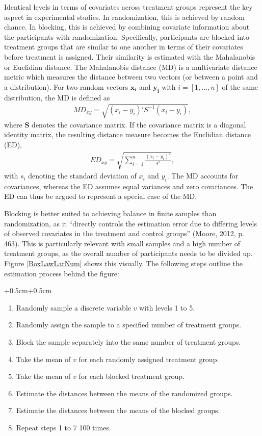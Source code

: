 \documentclass[12pt,econ]{sources/authesis}
\begin{document}
Identical levels in terms of covariates across treatment groups represent the key aspect in experimental studies. In randomization, this is achieved by random chance. In blocking, this is achieved by combining covariate information about the participants with randomization. Specifically, participants are blocked into treatment groups that are similar to one another in terms of their covariates before treatment is assigned. Their similarity is estimated with the Mahalanobis or Euclidian distance. The Mahalanobis distance (MD) is a multivariate distance metric which measures the distance between two vectors (or between a point and a distribution). For two random vectors \(\bm{x_i}\) and \(\bm{y_i}\) with \(i = [1,\ldots,n]\) of the same distribution, the MD is defined as
\begin{align}
MD_{xy} = \sqrt{(x_i - y_i)' S^{-1} (x_i - y_i)},
\end{align}
where \(\bm{S}\) denotes the covariance matrix. If the covariance matrix is a diagonal identity matrix, the resulting distance measure becomes the Euclidian distance (ED),
\begin{align}
ED_{xy} = \sqrt{\sum_{i=1}^n \frac{(x_i - y_i)^2}{s^2}},
\end{align}
with \(s_i\) denoting the standard deviation of \(x_i\) and \(y_i\). The MD accounts for covariances, whereas the ED assumes equal variances and zero covariances. The ED can thus be argued to represent a special case of the MD.

Blocking is better suited to achieving balance in finite samples than randomization, as it ``directly controls the estimation error due to differing levels of observed covariates in the treatment and control groups'' (Moore, 2012, p. 463). This is particularly relevant with small samples and a high number of treatment groups, as the overall number of participants needs to be divided up. Figure \ref{BoxLawLarNum} shows this visually. The following steps outline the estimation process behind the figure:

\vspace{0.3cm}
\begin{adjustwidth*}{+0.5cm}{+0.5cm}
\begin{enumerate}
\item \noindent Randomly sample a discrete variable $v$ with levels 1 to 5.
\item Randomly assign the sample to a specified number of treatment groups. 
\item Block the sample separately into the same number of treatment groups. 
\item Take the mean of $v$ for each randomly assigned treatment group. 
\item Take the mean of $v$ for each blocked treatment group. 
\item Estimate the distances between the means of the randomized groups.
\item Estimate the distances between the means of the blocked groups.
\item Repeat steps 1 to 7 100 times.
\end{enumerate}
\end{adjustwidth*}
\vspace{0.3cm}
\end{document}
